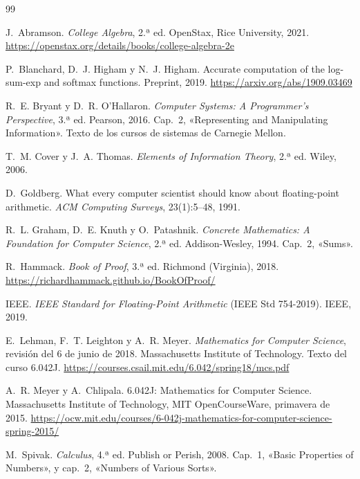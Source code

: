 \begin{thebibliography}{99}
\small

J.~Abramson.
\newblock \emph{College Algebra}, 2.ª ed.
\newblock OpenStax, Rice University, 2021.
\newblock \url{https://openstax.org/details/books/college-algebra-2e}

P.~Blanchard, D.~J. Higham y N.~J. Higham.
\newblock Accurate computation of the log-sum-exp and softmax functions.
\newblock Preprint, 2019.
\newblock \url{https://arxiv.org/abs/1909.03469}

R.~E. Bryant y D.~R. O'Hallaron.
\newblock \emph{Computer Systems: A Programmer's Perspective}, 3.ª ed.
\newblock Pearson, 2016.
\newblock Cap.~2, «Representing and Manipulating Information». Texto de los cursos de sistemas de Carnegie Mellon.

T.~M. Cover y J.~A. Thomas.
\newblock \emph{Elements of Information Theory}, 2.ª ed.
\newblock Wiley, 2006.

D.~Goldberg.
\newblock What every computer scientist should know about floating-point arithmetic.
\newblock \emph{ACM Computing Surveys}, 23(1):5--48, 1991.

R.~L. Graham, D.~E. Knuth y O.~Patashnik.
\newblock \emph{Concrete Mathematics: A Foundation for Computer Science}, 2.ª ed.
\newblock Addison-Wesley, 1994.
\newblock Cap.~2, «Sums».

R.~Hammack.
\newblock \emph{Book of Proof}, 3.ª ed.
\newblock Richmond (Virginia), 2018.
\newblock \url{https://richardhammack.github.io/BookOfProof/}

IEEE.
\newblock \emph{IEEE Standard for Floating-Point Arithmetic} (IEEE Std 754-2019).
\newblock IEEE, 2019.

E.~Lehman, F.~T. Leighton y A.~R. Meyer.
\newblock \emph{Mathematics for Computer Science}, revisión del 6 de junio de 2018.
\newblock Massachusetts Institute of Technology. Texto del curso 6.042J.
\newblock \url{https://courses.csail.mit.edu/6.042/spring18/mcs.pdf}

A.~R. Meyer y A.~Chlipala.
\newblock 6.042J: Mathematics for Computer Science.
\newblock Massachusetts Institute of Technology, MIT OpenCourseWare, primavera de 2015.
\newblock \url{https://ocw.mit.edu/courses/6-042j-mathematics-for-computer-science-spring-2015/}

M.~Spivak.
\newblock \emph{Calculus}, 4.ª ed.
\newblock Publish or Perish, 2008.
\newblock Cap.~1, «Basic Properties of Numbers», y cap.~2, «Numbers of Various Sorts».

\end{thebibliography}
